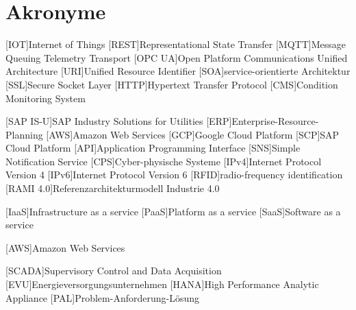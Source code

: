 \section*{Akronyme}            %
\begin{acronym}[SAP IS-U]
  [IOT]{Internet of Things}
  [REST]{Representational State Transfer}
  [MQTT]{Message Queuing Telemetry Transport}
  [OPC UA]{Open Platform Communications Unified Architecture}
  [URI]{Unified Resource Identifier}
  [SOA]{service-orientierte Architektur}
  [SSL]{Secure Socket Layer}
  [HTTP]{Hypertext Transfer Protocol}
  [CMS]{Condition Monitoring System}

  [SAP IS-U]{SAP Industry Solutions for Utilities}
  [ERP]{Enterprise-Resource-Planning}
  [AWS]{Amazon Web Services}
  [GCP]{Google Cloud Platform}
  [SCP]{SAP Cloud Platform}
  [API]{Application Programming Interface}
  [SNS]{Simple Notification Service}
  [CPS]{Cyber-physische Systeme}
  [IPv4]{Internet Protocol Version 4}
  [IPv6]{Internet Protocol Version 6}
  [RFID]{radio-frequency identification}
  [RAMI 4.0]{Referenzarchitekturmodell Industrie 4.0}

[IaaS]{Infrastructure as a service}
[PaaS]{Platform as a service}
[SaaS]{Software as a service}

[AWS]{Amazon Web Services}


[SCADA]{Supervisory Control and Data Acquisition}
[EVU]{Energieversorgungsunternehmen}
[HANA]{High Performance Analytic Appliance}
[PAL]{Problem-Anforderung-Lösung}

\end{acronym}

\newpage

\listoffigures
{}
\listoftables
{}
\lstlistoflistings
{}
\newpage
